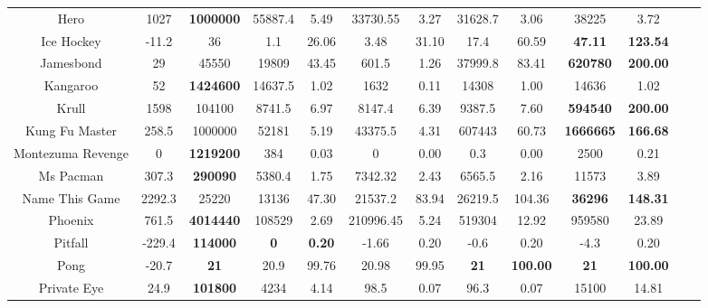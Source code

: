 \documentclass[nohyperref]{article}
\theoremstyle{plain}
\begin{document}
\begin{table}[!hb]
\begin{center}
\begin{tabular}{ |c |c |c| c c| c c|  c c |c c |c c |}
 Hero               & 1027      & \textbf{1000000}            & 55887.4  &5.49    & 33730.55   & 3.27       & 31628.7 & 3.06               &38225     &3.72\\
 Ice Hockey         & -11.2     & 36                 & 1.1      &26.06   & 3.48       & 31.10      & 17.4    & 60.59           &\textbf{47.11}           &\textbf{123.54}\\
 Jamesbond          & 29        & 45550              & 19809    &43.45   & 601.5      & 1.26       & 37999.8 & 83.41      &\textbf{620780}          &\textbf{200.00}\\
 Kangaroo           & 52        & \textbf{1424600}   & 14637.5  &1.02    & 1632       & 0.11       & 14308   & 1.00          &14636           &1.02\\
 Krull              & 1598      & 104100    & 8741.5   &6.97    & 8147.4     & 6.39       & 9387.5  & 7.60                    &\textbf{594540}          &\textbf{200.00}\\
 Kung Fu Master     & 258.5     & 1000000   & 52181    &5.19    & 43375.5    & 4.31       & 607443  & 60.73         &\textbf{1666665}          &\textbf{166.68}\\
 Montezuma Revenge  &0          & \textbf{1219200}   & 384      &0.03    & 0          & 0.00       & 0.3     & 0.00                &2500            &0.21\\
 Ms Pacman          & 307.3     & \textbf{290090}    & 5380.4   &1.75    & 7342.32    & 2.43       & 6565.5  & 2.16        &11573           &3.89\\
 Name This Game     & 2292.3    & 25220              & 13136    &47.30   & 21537.2    & 83.94      & 26219.5 & 104.36      &\textbf{36296}  &\textbf{148.31}\\
 Phoenix            & 761.5     & \textbf{4014440}   & 108529   &2.69    & 210996.45  & 5.24       & 519304  & 12.92                &959580          &23.89\\
 Pitfall            & -229.4    & \textbf{114000}    & \textbf{0}        &\textbf{0.20}    & -1.66      & 0.20       & -0.6    & 0.20                &-4.3            &0.20\\
 Pong               & -20.7     & \textbf{21}                 & 20.9     &99.76   & 20.98      & 99.95      & \textbf{21}      & \textbf{100.00}    &\textbf{21}     &\textbf{100.00}    \\
 Private Eye        & 24.9      & \textbf{101800}    & 4234     &4.14    & 98.5       & 0.07       & 96.3    & 0.07                  &15100           &14.81\\

\end{tabular}
\end{center}
\end{table}
\end{document}
